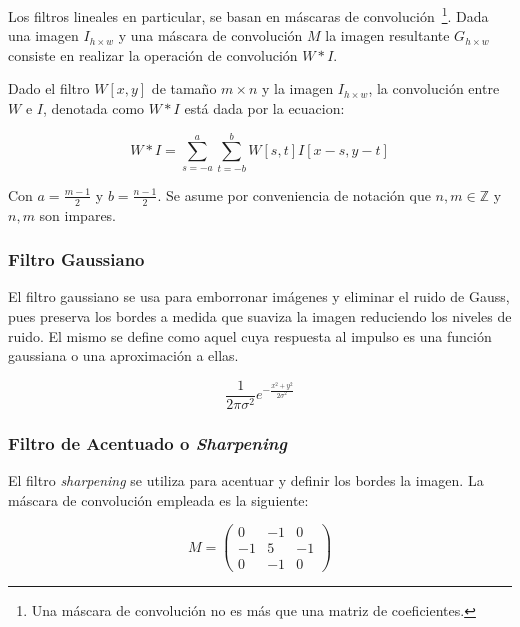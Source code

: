 Los filtros lineales en particular, se basan en máscaras de convolución~\footnote{Una máscara de convolución no es más que una matriz de coeficientes.}. Dada una imagen $I_{h \times w}$ y una máscara de convolución $M$ la imagen resultante $G_{h \times w}$ consiste en realizar la operación de convolución $W * I$.

\begin{definition}
	Dado el filtro $W[x, y]$ de tamaño $m \times n$ y la imagen $I_{h \times w}$, la convolución entre $W$ e $I$, denotada como $W * I$ está dada por la ecuacion:
	
	\begin{equation}
		W * I = \sum_{s = -a}^a\sum_{t = -b}^b W[s,t] I[x - s, y - t]
	\end{equation}

	Con $a = \frac{m -1}{2}$ y $b = \frac{n -1}{2}$. Se asume por conveniencia de notación que $n, m \in \mathbb{Z}$ y $n, m$ son impares.
\end{definition}



\subsubsection{Filtro Gaussiano}

El filtro gaussiano se usa para emborronar imágenes y eliminar el ruido de Gauss, pues preserva los bordes a medida que suaviza la imagen reduciendo los niveles de ruido. El mismo se define como aquel cuya respuesta al impulso es una función gaussiana o una aproximación a ellas.

\begin{equation}
	\frac{1}{2\pi\sigma^2} e^{-\frac{x^2 + y^2}{2\sigma^2}}
\end{equation}

\subsubsection{Filtro de Acentuado o \textit{Sharpening}}

El filtro \textit{sharpening} se utiliza para acentuar y definir los bordes la imagen. La máscara de convolución empleada es la siguiente:

\begin{equation}
	M = \begin{pmatrix} 
		0 & -1 & 0 \\
		-1 & 5 & -1 \\ 
		0 & -1 & 0
	\end{pmatrix}
\end{equation}

